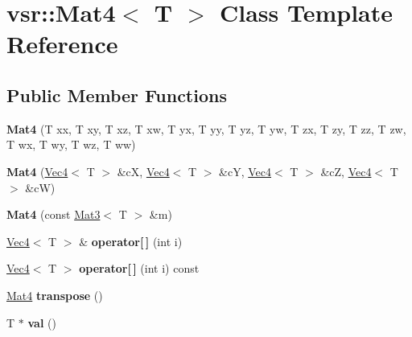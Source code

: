 \hypertarget{classvsr_1_1_mat4}{\section{vsr\-:\-:Mat4$<$ T $>$ Class Template Reference}
\label{classvsr_1_1_mat4}
}
\subsection*{Public Member Functions}
\begin{DoxyCompactItemize}
\item 
\hypertarget{classvsr_1_1_mat4_a6e8ecb4bd79009d265dc6b1c8b762740}{{\bfseries Mat4} (T xx, T xy, T xz, T xw, T yx, T yy, T yz, T yw, T zx, T zy, T zz, T zw, T wx, T wy, T wz, T ww)}\label{classvsr_1_1_mat4_a6e8ecb4bd79009d265dc6b1c8b762740}

\item 
\hypertarget{classvsr_1_1_mat4_a9db963760321fe6191dcc6f9ac7764d3}{{\bfseries Mat4} (\hyperlink{classvsr_1_1_vec4}{Vec4}$<$ T $>$ \&c\-X, \hyperlink{classvsr_1_1_vec4}{Vec4}$<$ T $>$ \&c\-Y, \hyperlink{classvsr_1_1_vec4}{Vec4}$<$ T $>$ \&c\-Z, \hyperlink{classvsr_1_1_vec4}{Vec4}$<$ T $>$ \&c\-W)}\label{classvsr_1_1_mat4_a9db963760321fe6191dcc6f9ac7764d3}

\item 
\hypertarget{classvsr_1_1_mat4_ae8a7b99ae88ffb09cd212c46636e992d}{{\bfseries Mat4} (const \hyperlink{classvsr_1_1_mat3}{Mat3}$<$ T $>$ \&m)}\label{classvsr_1_1_mat4_ae8a7b99ae88ffb09cd212c46636e992d}

\item 
\hypertarget{classvsr_1_1_mat4_ac6c1787c801e802feca71d92beb1f92f}{\hyperlink{classvsr_1_1_vec4}{Vec4}$<$ T $>$ \& {\bfseries operator\mbox{[}$\,$\mbox{]}} (int i)}\label{classvsr_1_1_mat4_ac6c1787c801e802feca71d92beb1f92f}

\item 
\hypertarget{classvsr_1_1_mat4_a5d6c30f0fcde8b13ce41a9b5e479c7b8}{\hyperlink{classvsr_1_1_vec4}{Vec4}$<$ T $>$ {\bfseries operator\mbox{[}$\,$\mbox{]}} (int i) const }\label{classvsr_1_1_mat4_a5d6c30f0fcde8b13ce41a9b5e479c7b8}

\item 
\hypertarget{classvsr_1_1_mat4_a98df09c2cb739c5d89e2b809c7601113}{\hyperlink{classvsr_1_1_mat4}{Mat4} {\bfseries transpose} ()}\label{classvsr_1_1_mat4_a98df09c2cb739c5d89e2b809c7601113}

\item 
\hypertarget{classvsr_1_1_mat4_ac234f3751eae858d17594fa2cfd1ea1e}{T $\ast$ {\bfseries val} ()}\label{classvsr_1_1_mat4_ac234f3751eae858d17594fa2cfd1ea1e}


\end{DoxyCompactItemize}
